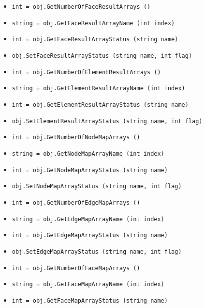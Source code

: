 \begin{itemize}
\item  \verb|int = obj.GetNumberOfFaceResultArrays ()|

\item  \verb|string = obj.GetFaceResultArrayName (int index)|

\item  \verb|int = obj.GetFaceResultArrayStatus (string name)|

\item  \verb|obj.SetFaceResultArrayStatus (string name, int flag)|

\item  \verb|int = obj.GetNumberOfElementResultArrays ()|

\item  \verb|string = obj.GetElementResultArrayName (int index)|

\item  \verb|int = obj.GetElementResultArrayStatus (string name)|

\item  \verb|obj.SetElementResultArrayStatus (string name, int flag)|

\item  \verb|int = obj.GetNumberOfNodeMapArrays ()|

\item  \verb|string = obj.GetNodeMapArrayName (int index)|

\item  \verb|int = obj.GetNodeMapArrayStatus (string name)|

\item  \verb|obj.SetNodeMapArrayStatus (string name, int flag)|

\item  \verb|int = obj.GetNumberOfEdgeMapArrays ()|

\item  \verb|string = obj.GetEdgeMapArrayName (int index)|

\item  \verb|int = obj.GetEdgeMapArrayStatus (string name)|

\item  \verb|obj.SetEdgeMapArrayStatus (string name, int flag)|

\item  \verb|int = obj.GetNumberOfFaceMapArrays ()|

\item  \verb|string = obj.GetFaceMapArrayName (int index)|

\item  \verb|int = obj.GetFaceMapArrayStatus (string name)|


\end{itemize}
